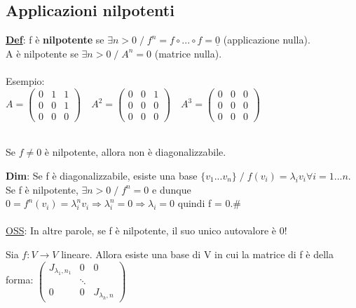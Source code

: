 \documentclass[12pt]{article}
\begin{document}
\subsection{Applicazioni nilpotenti}
\textbf{\underline{Def}}: f è \textbf{nilpotente} se $\exists n>0 \;/\; f^n=f\circ...\circ f = \underline{0}$ (applicazione nulla).\\
A è nilpotente se $\exists n>0 \;/\; A^n = 0$ (matrice nulla).\\\\
Esempio:\\
$A=\begin{pmatrix}
    0 & 1 & 1\\
    0 & 0 & 1\\
    0 & 0 & 0
\end{pmatrix}\quad A^2 = \begin{pmatrix}
    0 & 0 & 1\\
    0 & 0 & 0\\
    0 & 0 & 0
\end{pmatrix}\quad A^3 = \begin{pmatrix}
    0 & 0 & 0\\
    0 & 0 & 0\\
    0 & 0 & 0
\end{pmatrix}$\\\\
\begin{theorem}
    Se $f\neq 0 $ è nilpotente, allora non è diagonalizzabile.
\end{theorem}
\textbf{Dim}: Se f è diagonalizzabile, esiste una base $\{v_1...v_n\} \;/\; f(v_i) = \lambda_iv_i \forall i=1...n$.\\
Se f è nilpotente, $\exists n>0 \;/\; f^n = 0$ e dunque $0 = f^n(v_i) = \lambda_i^nv_i \Rightarrow \lambda_i^n = 0 \Rightarrow \lambda_i = 0$ quindi f = 0.\#\\\\
\underline{OSS}: In altre parole, se f è nilpotente, il suo unico autovalore è 0!\\
\begin{theorem}
 Sia $f: V\longrightarrow V$ lineare. Allora esiste una base di V in cui la matrice di f è della forma:
 $\begin{pmatrix}
     J_{\lambda_1,n_1} & 0 & 0\\
     & \ddots & \\
     0 & 0 & J_{\lambda_h, n}
 \end{pmatrix}$
\end{theorem}
\end{document}
